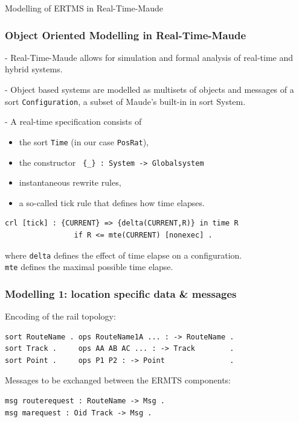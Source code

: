\documentclass{beamer}
\begin{document}
\begin{frame}
\begin{center}{\Large Modelling of ERTMS in Real-Time-Maude}
\end{center}
\end{frame}


\begin{frame}[fragile]
\frametitle{ Object Oriented Modelling in Real-Time-Maude}


- Real-Time-Maude allows for simulation and formal analysis of real-time and hybrid systems.

\bigskip

- Object based systems are modelled as multisets of objects and messages of a sort \texttt{Configuration}, a subset of Maude's built-in in sort System. 

\bigskip

 - A real-time specification consists of
\begin{itemize}
\item the sort \verb|Time| (in our case \verb|PosRat|), 
\item the constructor \verb| {_} : System -> Globalsystem|
\item instantaneous rewrite rules, 
\item a so-called tick rule that defines how time elapses.
\end{itemize}



\begin{verbatim}
crl [tick] : {CURRENT} => {delta(CURRENT,R)} in time R 
                if R <= mte(CURRENT) [nonexec] .
\end{verbatim}

where 
\verb|delta|  defines the effect of time elapse on a configuration.\\
\quad \qquad \verb|mte| defines the maximal possible time elapse.


\end{frame}






\begin{frame}[fragile]
\frametitle{Modelling 1:  location specific data \& messages}

Encoding of the rail topology:
\begin{verbatim}
sort RouteName . ops RouteName1A ... : -> RouteName .
sort Track .     ops AA AB AC ... : -> Track        .
sort Point .     ops P1 P2 : -> Point               . 
\end{verbatim}

\bigskip

Messages to be exchanged between the ERMTS components:
\begin{verbatim}
msg routerequest : RouteName -> Msg . 
msg marequest : Oid Track -> Msg .
\end{verbatim}

\end{frame}
\end{document}
